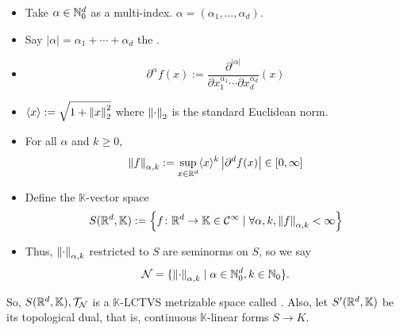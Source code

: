 \documentclass[11pt,leqno,oneside]{amsbook}
\numberwithin{thm}{section}
\newcommand{\Top}{\mathcal{T}} %
\newcommand{\cN}{\mathcal{N}}
\newcommand{\norms}{\cN}
\begin{document}
\begin{defn}
  \begin{itemize}
  \item Take \(\alpha \in \N_0^d\) as a multi-index. \(\alpha =
    (\alpha_1, \ldots, \alpha_d)\).
  \item Say \(|\alpha| = \alpha_1 + \cdots + \alpha_d\) the .
  \item \[
      \partial^\alpha f(x) := \frac{\partial^{|\alpha|}}{\partial
        x_1^{\alpha_1} \cdots \partial x_d^{\alpha_d}}(x)
    \]
  \item \(\langle x \rangle := \sqrt{1+\norm[x]_2^2}\) where
    \(\norm_2\) is the standard Euclidean norm.
  \item For all \(\alpha\) and \(k \geq 0\), \[
      \norm[f]_{\alpha,k} := \sup_{x \in \R^d} \langle x \rangle^k
      \left| \partial^d f(x) \right| \in [0,\infty]
    \]
  \item Define the \(\mathbb{K}\)-vector space \[
      S(\R^d,\mathbb{K}) := \left\{ f \from \R^d \to \mathbb{K} \in
        \mathcal{C}^\infty \st \forall \alpha, k, \norm[f]_{\alpha,k}
        < \infty \right\}
    \]
  \item Thus, \(\norm_{\alpha,k}\) restricted to \(S\) are seminorms
    on \(S\), so we say \[
      \norms = \{\norm_{\alpha,k} \st \alpha \in \N_0^d, k \in \N_0\}.
    \]
  \end{itemize}
  So, \(S(\R^d,\mathbb{K}), \Top_\norms\) is a \(\mathbb{K}\)-LCTVS
  metrizable space called . Also, let
  \(S'(\R^d,\mathbb{K})\) be its topological dual, that is, continuous
  \(\mathbb{K}\)-linear forms \(S \to K\). 
\end{defn}
\end{document}
